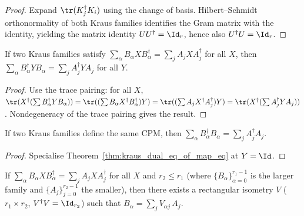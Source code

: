 \begin{proof}
    \leanok
    Expand $\tr(K_j^\dagger K_i)$ using the change of basis.
    Hilbert--Schmidt orthonormality of both Kraus families identifies
    the Gram matrix with the identity, yielding the matrix identity
    $U U^\dagger = \Id_r$, hence also $U^\dagger U = \Id_r$.
\end{proof}

\begin{theorem}\label{thm:kraus_dual_eq_of_map_eq}
    \leanok
    If two Kraus families satisfy
    $\sum_\alpha B_\alpha X B_\alpha^\dagger = \sum_j A_j X A_j^\dagger$
    for all $X$, then
    $\sum_\alpha B_\alpha^\dagger Y B_\alpha = \sum_j A_j^\dagger Y A_j$
    for all $Y$.
\end{theorem}

\begin{proof}
    \leanok
    Use the trace pairing: for all $X$,
    $\tr(X^\dagger (\sum B_\alpha^\dagger Y B_\alpha))
        = \tr((\sum B_\alpha X^\dagger B_\alpha^\dagger) Y)
        = \tr((\sum A_j X^\dagger A_j^\dagger) Y)
        = \tr(X^\dagger (\sum A_j^\dagger Y A_j))$.
    Nondegeneracy of the trace pairing gives the result.
\end{proof}

\begin{theorem}\label{thm:kraus_conjTranspose_mul_eq_of_map_eq}
    \leanok
    If two Kraus families define the same CPM, then
    $\sum_\alpha B_\alpha^\dagger B_\alpha = \sum_j A_j^\dagger A_j$.
\end{theorem}

\begin{proof}
    \leanok
    Specialise Theorem~\ref{thm:kraus_dual_eq_of_map_eq} at $Y = \Id$.
\end{proof}

\begin{theorem}\label{thm:kraus_rectangular_freedom}
    \leanok
    If $\sum_\alpha B_\alpha X B_\alpha^\dagger = \sum_j A_j X A_j^\dagger$
    for all $X$ and $r_2 \le r_1$ (where $\{B_\alpha\}_{\alpha=0}^{r_1-1}$
    is the larger family and $\{A_j\}_{j=0}^{r_2-1}$ the smaller),
    then there exists a rectangular isometry
    $V$ ($r_1 \times r_2$, $V^\dagger V = \Id_{r_2}$) such that
    $B_\alpha = \sum_j V_{\alpha j}\,A_j$.
\end{theorem}


